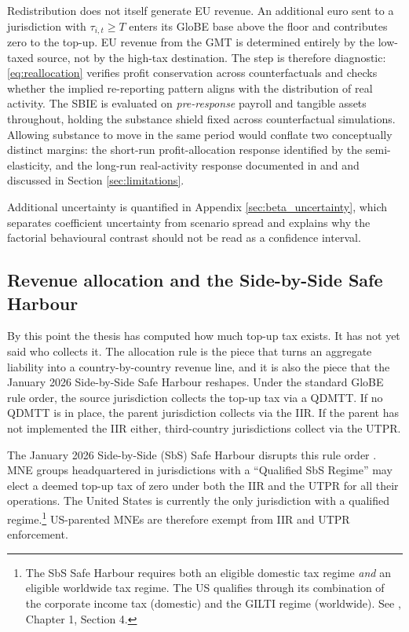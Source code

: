 \documentclass[11pt,a4paper]{article}
\begin{document}
Redistribution does not itself generate EU revenue. An additional euro sent to a jurisdiction with $\tau_{i,t}\ge T$ enters its GloBE base above the floor and contributes zero to the top-up. EU revenue from the GMT is determined entirely by the low-taxed source, not by the high-tax destination. The step is therefore diagnostic: \eqref{eq:reallocation} verifies profit conservation across counterfactuals and checks whether the implied re-reporting pattern aligns with the distribution of real activity. The SBIE is evaluated on \emph{pre-response} payroll and tangible assets throughout, holding the substance shield fixed across counterfactual simulations. Allowing substance to move in the same period would conflate two conceptually distinct margins: the short-run profit-allocation response identified by the semi-elasticity, and the long-run real-activity response documented in \citet{bilicka2022} and \citet{suarezserrato2018} and discussed in Section \ref{sec:limitations}.

Additional uncertainty is quantified in Appendix \ref{sec:beta_uncertainty}, which separates coefficient uncertainty from scenario spread and explains why the factorial behavioural contrast should not be read as a confidence interval.

\subsection{Revenue allocation and the Side-by-Side Safe Harbour}\label{sec:sbs}\label{sec:jan2026}

By this point the thesis has computed how much top-up tax exists. It has not yet said who collects it. The allocation rule is the piece that turns an aggregate liability into a country-by-country revenue line, and it is also the piece that the January 2026 Side-by-Side Safe Harbour reshapes. Under the standard GloBE rule order, the source jurisdiction collects the top-up tax via a QDMTT. If no QDMTT is in place, the parent jurisdiction collects via the IIR. If the parent has not implemented the IIR either, third-country jurisdictions collect via the UTPR.

The January 2026 Side-by-Side (SbS) Safe Harbour disrupts this rule order \citep{oecd2026}. MNE groups headquartered in jurisdictions with a ``Qualified SbS Regime'' may elect a deemed top-up tax of zero under both the IIR and the UTPR for all their operations. The United States is currently the only jurisdiction with a qualified regime.\footnote{The SbS Safe Harbour requires both an eligible domestic tax regime \emph{and} an eligible worldwide tax regime. The US qualifies through its combination of the corporate income tax (domestic) and the GILTI regime (worldwide). See \citet{oecd2026}, Chapter 1, Section 4.} US-parented MNEs are therefore exempt from IIR and UTPR enforcement.
\end{document}
